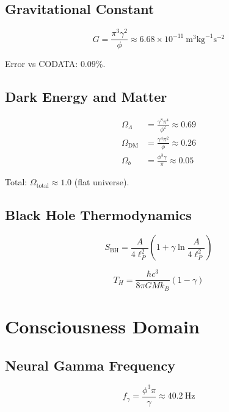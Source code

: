 \documentclass[12pt,a4paper]{article}
\begin{document}
\subsection{Gravitational Constant}

\begin{equation}
G = \frac{\pi^3 \gamma^2}{\phi} \approx 6.68 \times 10^{-11}~\text{m}^3\text{kg}^{-1}\text{s}^{-2}
\end{equation}

Error vs CODATA: $0.09\%$.

\subsection{Dark Energy and Matter}

\begin{align}
\Omega_\Lambda &= \frac{\gamma^8 \pi^4}{\phi^2} \approx 0.69 \\
\Omega_{\text{DM}} &= \frac{\gamma^4 \pi^2}{\phi} \approx 0.26 \\
\Omega_b &= \frac{\phi^3 \gamma}{\pi} \approx 0.05
\end{align}

Total: $\Omega_{\text{total}} \approx 1.0$ (flat universe).

\subsection{Black Hole Thermodynamics}

\begin{equation}
S_{\text{BH}} = \frac{A}{4\ell_P^2}\left(1 + \gamma \ln\frac{A}{4\ell_P^2}\right)
\end{equation}

\begin{equation}
T_H = \frac{\hbar c^3}{8\pi GM k_B}(1 - \gamma)
\end{equation}

\section{Consciousness Domain}

\subsection{Neural Gamma Frequency}

\begin{equation}
f_\gamma = \frac{\phi^3 \pi}{\gamma} \approx 40.2~\text{Hz}
\end{equation}
\end{document}
